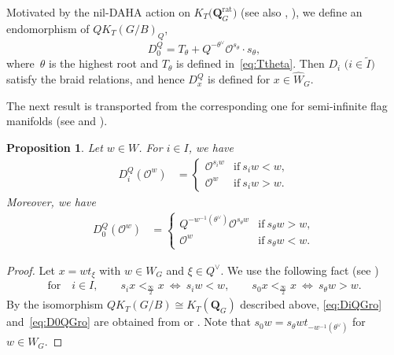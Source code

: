 \documentclass[pdftex]{sigma}
\numberwithin{equation}{section}
\newcommand{\sinf}{\frac{\infty}{2}}
\newtheorem{Proposition}[Theorem]{Proposition}
\theoremstyle{definition}
\begin{document}
Motivated by the nil-DAHA action on $K_T\bigl(\mathbf{Q}_G^{\mathrm{rat}}\bigr)$
\cite[Theorem 6.5]{KNS} (see also \cite[Section~3.1]{KoNOS}, \cite[Section~2.6]{Orr}),
we define
an endomorphism of
$QK_T(G/B)_Q$,
\[
D_0^Q=T_\theta+
Q^{-\theta^\vee}
\mathscr{O}^{s_\theta}\cdot
s_\theta,
\]
where~$\theta$ is the highest root and $T_\theta$ is defined in~\eqref{eq:Ttheta}.
Then $D_i$ $ \big(i\in \tilde{I}\big)$ satisfy the braid relations, and hence $D_x^Q$ is defined for $x\in \hat{W}_G$.

The next result is transported from
the corresponding one for semi-infinite flag manifolds
(see \cite[Section~2.6]{Orr} and \cite[Section~3.1]{KoNOS}).
\begin{Proposition}\label{prop:left_Dem}
Let $w\in W$. For $i\in I$, we have
\begin{align}
\label{eq:DiQGro}
D_i^Q(\mathscr{O}^w)
&=\begin{cases}
\mathscr{O}^{s_iw} & \text{if}\ s_iw<w,\\
 \mathscr{O}^{w} & \text{if}\ s_iw>w.
\end{cases} \end{align}
Moreover, we have
\begin{align}
\label{eq:D0QGro}
D_0^Q(\mathscr{O}^w)
&=\begin{cases}
 Q^{-w^{-1}(\theta^\vee)}\mathscr{O}^{s_\theta w} & \text{if}\ s_\theta w>w,\\
 \mathscr{O}^{w} & \text{if}\ s_\theta w<w.
\end{cases}
\end{align}
\end{Proposition}
\begin{proof}
Let $x=wt_\xi$
with $w\in W_G$
and $\xi\in Q^{\lor}$.
We use the following fact (see \cite[Appendix~A]{INS})
\begin{align*}
\text{for}\quad i\in I,\qquad s_i x<_\sinf x   \ \Longleftrightarrow \ s_i w< w,\qquad
 s_0 x<_\sinf x \ \Longleftrightarrow \ s_\theta w>w.
\end{align*}
By the isomorphism
$QK_T(G/B)\cong K_T(\mathbf{Q}_G)$ described above,
\eqref{eq:DiQGro} and~\eqref{eq:D0QGro} are obtained from
\cite[equation~(2.28)]{Orr} or \cite[equation~(3.19)]{KoNOS}.
Note that $s_0w=s_\theta w t_{-w^{-1}(\theta^\lor)}$
for $w\in W_G$.
\end{proof}
\end{document}
